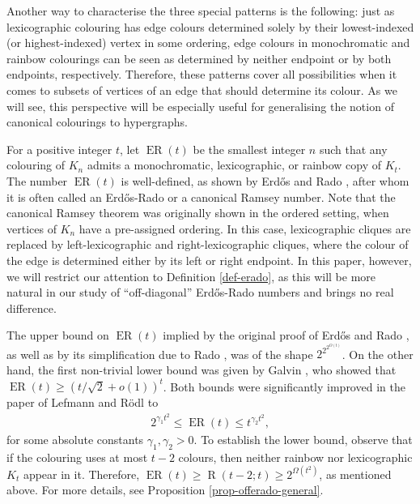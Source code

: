\documentclass[11pt]{article}
\theoremstyle{plain}
\theoremstyle{definition}
\newcommand{\eradograph}[1]{\operatorname{ER}(#1)}
\begin{document}
Another way to characterise the three special patterns is the following: just as lexicographic colouring has edge colours determined solely by their lowest-indexed (or highest-indexed) vertex in some ordering, edge colours in monochromatic and rainbow colourings can be seen as determined by neither endpoint or by both endpoints, respectively. Therefore, these patterns cover all possibilities when it comes to subsets of vertices of an edge that should determine its colour. As we will see, this perspective will be especially useful for generalising the notion of canonical colourings to hypergraphs.

For a positive integer $t$, let $\eradograph{t}$ be the smallest integer $n$ such that any colouring of $K_n$ admits a monochromatic, lexicographic, or rainbow copy of $K_t$. The number $\eradograph{t}$ is well-defined, as shown by Erd\H{o}s and Rado \cite{erdos1950combinatorial}, after whom it is often called an Erd\H{o}s-Rado or a canonical Ramsey number. Note that the canonical Ramsey theorem was originally shown in the ordered setting, when vertices of $K_n$ have a pre-assigned ordering. In this case, lexicographic cliques are replaced by left-lexicographic and right-lexicographic cliques, where the colour of the edge is determined either by its left or right endpoint. In this paper, however, we will restrict our attention to Definition \ref{def-erado}, as this will be more natural in our study of ``off-diagonal'' Erd\H{o}s-Rado numbers and brings no real difference.

The upper bound on $\eradograph{t}$ implied by the original proof of Erd\H{o}s and Rado \cite{erdos1950combinatorial}, as well as by its simplification due to Rado \cite{rado1986note}, was of the shape $2^{2^{2^{O(t)}}}$. On the other hand, the first non-trivial lower bound was given by Galvin \cite[p.30]{erdHos1974probabilistic}, who showed that $\eradograph{t}\ge (t/\sqrt{2}+o(1))^t$. Both bounds were significantly improved in the paper of Lefmann and R\"odl \cite{lefmann1995erdHos} to 
\begin{align}\label{eq-lef-rodl-bounds}
    2^{\gamma_1t^2}\le \eradograph{t}\le t^{\gamma_2t^2},
\end{align}
for some absolute constants $\gamma_1,\gamma_2>0$. To establish the lower bound, observe that if the colouring uses at most $t-2$ colours, then neither rainbow nor lexicographic $K_t$ appear in it. Therefore, $\eradograph{t}\geq \operatorname{R}(t-2;t)\geq 2^{\Omega(t^2)}$, as mentioned above. For more details, see Proposition \ref{prop-offerado-general}.
\end{document}
